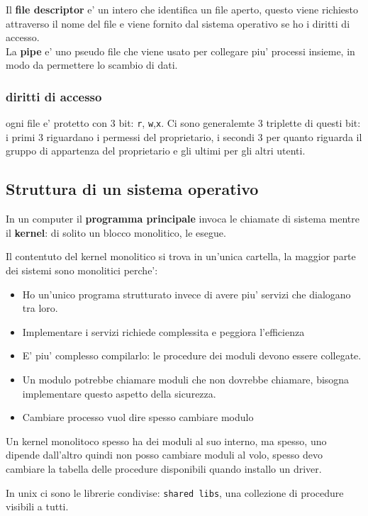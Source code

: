 Il \textbf{file descriptor} e' un intero che identifica un file aperto, questo 
viene richiesto attraverso il nome del file e viene fornito dal sistema operativo se 
ho i diritti di accesso. \\

La \textbf{pipe} e' uno pseudo file che viene usato per collegare piu' processi
insieme, in modo da permettere lo scambio di dati.

\subsubsection{diritti di accesso}
ogni file e' protetto con 3 bit: \texttt{r}, \texttt{w},\texttt{x}.
Ci sono generalemte 3 triplette di questi bit: i primi 3 riguardano i permessi del proprietario,
i secondi 3 per quanto riguarda il gruppo di appartenza del proprietario e gli ultimi per gli altri utenti.

\subsection{Struttura di un sistema operativo}
In un computer il \textbf{programma principale} invoca le chiamate di sistema mentre
il \textbf{kernel}: di solito un blocco monolitico, le esegue.

Il contentuto del kernel monolitico si trova in un'unica cartella, la maggior parte dei sistemi
sono monolitici perche':
\begin{itemize}
    \item Ho un'unico programa strutturato invece di avere piu' servizi che dialogano tra loro.
    \item Implementare i servizi richiede complessita e peggiora l'efficienza
    \item E' piu' complesso compilarlo: le procedure dei moduli devono essere collegate.
    \item Un modulo potrebbe chiamare moduli che non dovrebbe chiamare, bisogna implementare questo aspetto della sicurezza.
    \item Cambiare processo vuol dire spesso cambiare modulo
\end{itemize}

Un kernel monolitoco spesso ha dei moduli al suo interno, ma spesso, uno dipende dall'altro
quindi non posso cambiare moduli al volo, spesso devo cambiare la tabella delle procedure disponibili
quando installo un driver.

In unix ci sono le librerie condivise: \texttt{shared libs}, una collezione di procedure visibili a tutti.

